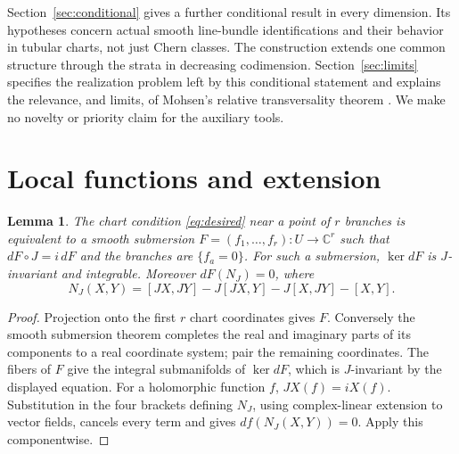 \documentclass[11pt]{article}
\newtheorem{lemma}[theorem]{Lemma}
\theoremstyle{definition}
\theoremstyle{remark}
\newcommand{\C}{\mathbb C}
\begin{document}
Section~\ref{sec:conditional} gives a further conditional result in every dimension. Its hypotheses concern actual smooth line-bundle identifications and their behavior in tubular charts, not just Chern classes. The construction extends one common structure through the strata in decreasing codimension. Section~\ref{sec:limits} specifies the realization problem left by this conditional statement and explains the relevance, and limits, of Mohsen's relative transversality theorem \cite[p.~657]{Mohsen}. We make no novelty or priority claim for the auxiliary tools.

\section{Local functions and extension}\label{sec:local}

\begin{lemma}\label{lem:submersion}
The chart condition \eqref{eq:desired} near a point of $r$ branches is equivalent to a smooth submersion $F=(f_1,\ldots,f_r):U\to\C^r$ such that $dF\circ J=i\,dF$ and the branches are $\{f_a=0\}$. For such a submersion, $\ker dF$ is $J$-invariant and integrable. Moreover $dF(N_J)=0$, where
\[
 N_J(X,Y)=[JX,JY]-J[JX,Y]-J[X,JY]-[X,Y].
\]
\end{lemma}
\begin{proof}
Projection onto the first $r$ chart coordinates gives $F$. Conversely the smooth submersion theorem completes the real and imaginary parts of its components to a real coordinate system; pair the remaining coordinates. The fibers of $F$ give the integral submanifolds of $\ker dF$, which is $J$-invariant by the displayed equation.
For a holomorphic function $f$, $JX(f)=iX(f)$. Substitution in the four brackets defining $N_J$, using complex-linear extension to vector fields, cancels every term and gives $df(N_J(X,Y))=0$. Apply this componentwise.
\end{proof}
\end{document}
